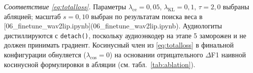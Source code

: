 \documentclass[a4paper, 12pt, oneside, openany]{article}
\begin{document}
\textit{Соответствие \eqref{eq:totalloss}.} Параметры $\lambda_{\text{ce}}=0{,}05$, $\lambda_{\text{KL}}=0{,}1$, $\tau=2{,}0$ выбраны абляцией; масштаб $s=0{,}10$ выбран по результатам поиска веса в [06\_finetune\_wav2lip.ipynb](06\_finetune\_wav2lip.ipynb). Аудиологиты дистиллируются с \texttt{detach()}, поскольку аудиоэнкодер на этапе 5 заморожен и не должен принимать градиент. Косинусный член из \eqref{eq:totalloss} в финальной конфигурации обнуляется ($\lambda_{\cos}=0$) на основании отрицательного $\Delta$F1 наивной косинусной формулировки в абляции (см. табл.~\ref{tab:ablation}).

% 







\end{document}
